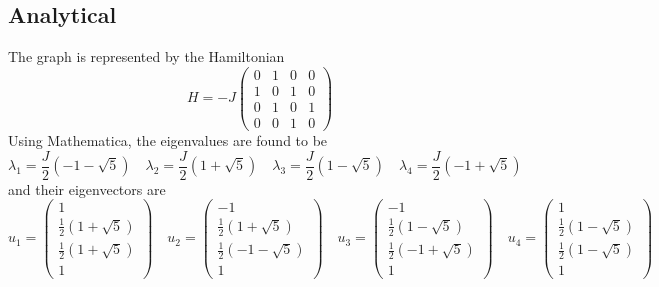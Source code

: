 \documentclass[aps]{revtex4-2}
\begin{document}
\subsection{Analytical}
\noindent The graph is represented by the Hamiltonian
\begin{equation}
    H=-J\begin{pmatrix}
        0&1&0&0\\
        1&0&1&0\\
        0&1&0&1\\
        0&0&1&0
    \end{pmatrix}
\end{equation}
Using Mathematica, the eigenvalues are found to be
\begin{equation}
    \lambda_1=\frac{J}{2}(-1-\sqrt{5})\quad\lambda_2=\frac{J}{2}(1+\sqrt{5})\quad\lambda_3=\frac{J}{2}(1-\sqrt{5})\quad\lambda_4=\frac{J}{2}(-1+\sqrt{5})
\end{equation}
and their eigenvectors are
\begin{equation}
    u_1=\begin{pmatrix}
        1\\
        \frac{1}{2}(1+\sqrt{5})\\
        \frac{1}{2}(1+\sqrt{5})\\
        1
    \end{pmatrix}\quad u_2=\begin{pmatrix}
        -1\\
        \frac{1}{2}(1+\sqrt{5})\\
        \frac{1}{2}(-1-\sqrt{5})\\
        1
    \end{pmatrix}\quad u_3=\begin{pmatrix}
        -1\\
        \frac{1}{2}(1-\sqrt{5})\\
        \frac{1}{2}(-1+\sqrt{5})\\
        1
    \end{pmatrix}\quad u_4=\begin{pmatrix}
        1\\
        \frac{1}{2}(1-\sqrt{5})\\
        \frac{1}{2}(1-\sqrt{5})\\
        1
    \end{pmatrix}
\end{equation}
\end{document}
